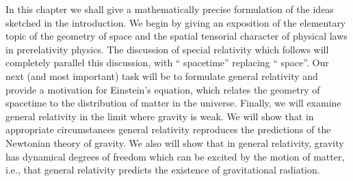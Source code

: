 
In this chapter we shall give a mathematically precise formulation of the ideas
sketched in the introduction. We begin by giving an exposition of the elementary
topic of the geometry of space and the spatial tensorial character of physical laws
in prerelativity physics. The discussion of special relativity which follows will
completely parallel this discussion, with \textquotedblleft
spacetime\textquotedblright{} replacing \textquotedblleft
space\textquotedblright. Our next (and most important) task will be to formulate
general relativity and provide a motivation for Einstein's equation, which relates
the geometry of spacetime to the distribution of matter in the universe. Finally,
we will examine general relativity in the limit where gravity is weak. We will show
that in appropriate circumstances general relativity reproduces the predictions of
the Newtonian theory of gravity. We also will show that in general relativity,
gravity has dynamical degrees of freedom which can be excited by the motion of
matter, i.e., that general relativity predicts the existence of gravitational
radiation.


